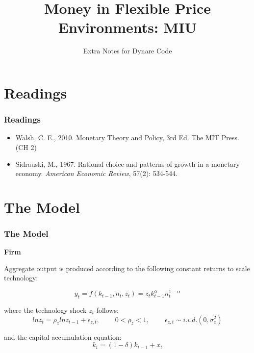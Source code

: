 \documentclass[handout]{beamer}
\title{Money in Flexible Price Environments: MIU}
\subtitle{Extra Notes for Dynare Code}
\author{}
\institute{}
\date{}
\begin{document}
\frame{\titlepage}


\section{Readings}
\begin{frame}

\frametitle{Readings} 


\begin{itemize}
\item Walsh, C. E., 2010. Monetary Theory and Policy, 3rd Ed. The MIT Press. (CH 2) \\
\vskip 0.1in
\item Sidrauski, M., 1967. Rational choice and patterns of growth in
a monetary economy. \emph{American Economic Review}, 57(2): 534-544.
\end{itemize}
\end{frame}



\section{The Model}

\begin{frame}
\frametitle{The Model} 

\textbf{Firm}

Aggregate output is produced according to the following constant
returns to scale technology:

\begin{equation}\label{Eq5.1}
y_{t}=f(k_{t-1},n_{t},z_{t})=z_{t}k_{t-1}^{\alpha}n_{t}^{1-\alpha}
\end{equation}

where the technology shock $z_{t}$ follows:
\begin{equation}\label{Eq5.2}
lnz_{t}=\rho_{z} lnz_{t-1}+\epsilon_{z,t}, ~ \qquad 0<\rho_{z}<1, ~
\qquad \epsilon_{z,t} \sim i.i.d.(0,\sigma_{z}^{2})
\end{equation}

and the capital accumulation equation:
\begin{equation}\label{Eq5.3}
k_{t}=(1-\delta)k_{t-1}+x_{t}
\end{equation}
\end{frame}
\end{document}
